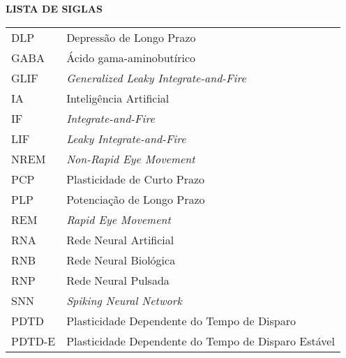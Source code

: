 \begin{center}
\textbf{LISTA DE SIGLAS}
\end{center}
\vspace*{0.5cm}
\begin{tabular}{ll}
DLP & Depressão de Longo Prazo \\
GABA & Ácido gama-aminobutírico \\
GLIF & \textit{Generalized Leaky Integrate-and-Fire} \\
IA & Inteligência Artificial \\
IF & \textit{Integrate-and-Fire} \\
LIF & \textit{Leaky Integrate-and-Fire} \\
NREM & \textit{Non-Rapid Eye Movement} \\
PCP & Plasticidade de Curto Prazo \\
PLP & Potenciação de Longo Prazo \\
REM & \textit{Rapid Eye Movement} \\
RNA & Rede Neural Artificial \\
RNB & Rede Neural Biológica \\
RNP & Rede Neural Pulsada \\
SNN & \textit{Spiking Neural Network} \\
PDTD & Plasticidade Dependente do Tempo de Disparo \\
PDTD-E & Plasticidade Dependente do Tempo de Disparo Estável \\

\end{tabular}
\addtocounter{table}{0}